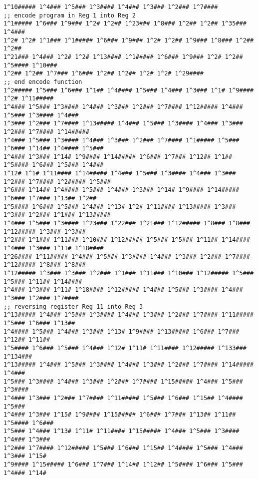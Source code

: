 \begin{@twocolumnfalse}
\begin{lstlisting}
1^10##### 1^4### 1^5### 1^3#### 1^4### 1^3### 1^2### 1^7####
;; encode program in Reg 1 into Reg 2
1^1##### 1^6### 1^9### 1^2# 1^2## 1^23### 1^8### 1^2## 1^2## 1^35### 1^4###
1^2# 1^2# 1^1### 1^1##### 1^6### 1^9### 1^2# 1^2## 1^9### 1^8### 1^2## 1^2##
1^21### 1^4### 1^2# 1^2# 1^13#### 1^1##### 1^6### 1^9### 1^2# 1^2## 1^5#### 1^10###
1^2## 1^2## 1^7### 1^6### 1^2## 1^2## 1^2# 1^2# 1^29####
;; end encode function
1^2##### 1^5### 1^6### 1^1## 1^4#### 1^5### 1^4### 1^3### 1^1# 1^9#### 1^2# 1^11#####
1^4### 1^5### 1^3#### 1^4### 1^3### 1^2### 1^7#### 1^12##### 1^4### 1^5### 1^3#### 1^4###
1^3### 1^2### 1^7#### 1^13##### 1^4### 1^5### 1^3#### 1^4### 1^3### 1^2### 1^7#### 1^14#####
1^4### 1^5### 1^3#### 1^4### 1^3### 1^2### 1^7#### 1^1##### 1^5### 1^6### 1^14## 1^4#### 1^5###
1^4### 1^3### 1^14# 1^9#### 1^14##### 1^6### 1^7### 1^12## 1^1## 1^5#### 1^6### 1^5### 1^4###
1^12# 1^1# 1^11#### 1^14##### 1^4### 1^5### 1^3#### 1^4### 1^3### 1^2### 1^7#### 1^2##### 1^5###
1^6### 1^14## 1^4#### 1^5### 1^4### 1^3### 1^14# 1^9#### 1^14##### 1^6### 1^7### 1^13## 1^2##
1^5#### 1^6### 1^5### 1^4### 1^13# 1^2# 1^11#### 1^13##### 1^3### 1^3### 1^2### 1^1### 1^13#####
1^4### 1^5### 1^3#### 1^23### 1^22### 1^21### 1^12##### 1^8### 1^8### 1^12##### 1^3### 1^3###
1^2### 1^1### 1^11### 1^10### 1^12##### 1^5### 1^5### 1^11## 1^14#### 1^4### 1^3### 1^11# 1^18####
1^26#### 1^11##### 1^4### 1^5### 1^3#### 1^4### 1^3### 1^2### 1^7#### 1^12##### 1^8### 1^8###
1^12##### 1^3### 1^3### 1^2### 1^1### 1^11### 1^10### 1^12##### 1^5### 1^5### 1^11## 1^14####
1^4### 1^3### 1^11# 1^18#### 1^12##### 1^4### 1^5### 1^3#### 1^4### 1^3### 1^2### 1^7####
;; reversing register Reg 11 into Reg 3
1^13##### 1^4### 1^5### 1^3#### 1^4### 1^3### 1^2### 1^7#### 1^11##### 1^5### 1^6### 1^13##
1^4#### 1^5### 1^4### 1^3### 1^13# 1^9#### 1^13##### 1^6### 1^7### 1^12## 1^11##
1^5#### 1^6### 1^5### 1^4### 1^12# 1^11# 1^11#### 1^12##### 1^133### 1^134###
1^13##### 1^4### 1^5### 1^3#### 1^4### 1^3### 1^2### 1^7#### 1^14##### 1^4###
1^5### 1^3#### 1^4### 1^3### 1^2### 1^7#### 1^15##### 1^4### 1^5### 1^3####
1^4### 1^3### 1^2### 1^7#### 1^11##### 1^5### 1^6### 1^15## 1^4#### 1^5###
1^4### 1^3### 1^15# 1^9#### 1^15##### 1^6### 1^7### 1^13## 1^11## 1^5#### 1^6###
1^5### 1^4### 1^13# 1^11# 1^11#### 1^15##### 1^4### 1^5### 1^3#### 1^4### 1^3###
1^2### 1^7#### 1^12##### 1^5### 1^6### 1^15## 1^4#### 1^5### 1^4### 1^3### 1^15#
1^9#### 1^15##### 1^6### 1^7### 1^14## 1^12## 1^5#### 1^6### 1^5### 1^4### 1^14#

\end{lstlisting}
\end{@twocolumnfalse}
